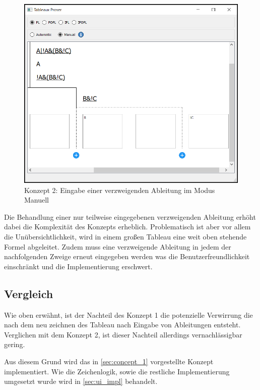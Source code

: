 \begin{figure}[H]
\begin{center}
\includegraphics[scale=0.7]{images/gui_concept_2_manual_enter_branch.png}
\caption{Konzept 2: Eingabe einer verzweigenden Ableitung im Modus Manuell}
\label{fig:gui_concept_2_manual_enter_branch}
\end{center}
\end{figure}

Die Behandlung einer nur teilweise eingegebenen verzweigenden Ableitung erhöht dabei die Komplexität des Konzepts erheblich. Problematisch ist aber vor allem die Unübersichtlichkeit, wird in einem großen Tableau eine weit oben stehende Formel abgeleitet. Zudem muss eine verzweigende Ableitung in jedem der nachfolgenden Zweige erneut eingegeben werden was die Benutzerfreundlichkeit einschränkt und die Implementierung erschwert.

\subsection{Vergleich}
Wie oben erwähnt, ist der Nachteil des Konzept 1 die potenzielle Verwirrung die nach dem neu zeichnen des Tableau nach Eingabe von Ableitungen entsteht. Verglichen mit dem Konzept 2, ist dieser Nachteil allerdings vernachlässigbar gering.

Aus diesem Grund wird das in \autoref{sec:concept_1} vorgestellte Konzept implementiert. Wie die Zeichenlogik, sowie die restliche Implementierung umgesetzt wurde wird in \autoref{sec:ui_impl} behandelt.

